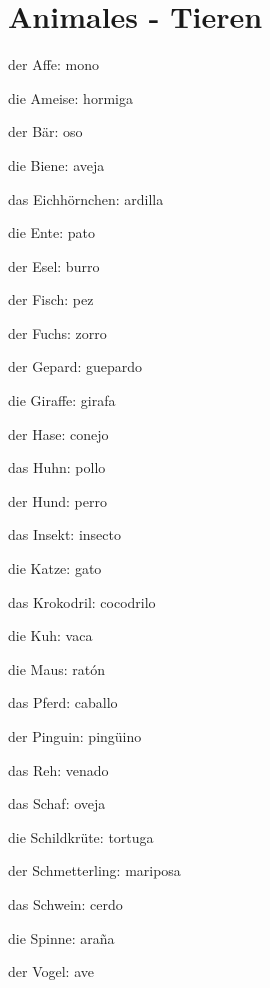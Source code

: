 \section{Animales - Tieren}
\begin{multicols}{3}
\begin{myitemize}
\item der Affe: mono
\item die Ameise: hormiga
\item der Bär: oso
\item die Biene: aveja
\item das Eichhörnchen: ardilla
\item die Ente: pato
\item der Esel: burro
\item der Fisch: pez
\item der Fuchs: zorro
\item der Gepard: guepardo
\item die Giraffe: girafa
\item der Hase: conejo
\item das Huhn: pollo
\item der Hund: perro
\item das Insekt: insecto
\item die Katze: gato
\item das Krokodril: cocodrilo
\item die Kuh: vaca
\item die Maus: ratón
\item das Pferd: caballo
\item der Pinguin: pingüino
\item das Reh: venado
\item das Schaf: oveja
\item die Schildkrüte: tortuga
\item der Schmetterling: mariposa
\item das Schwein: cerdo
\item die Spinne: araña
\item der Vogel: ave
\end{myitemize}
\end{multicols}

